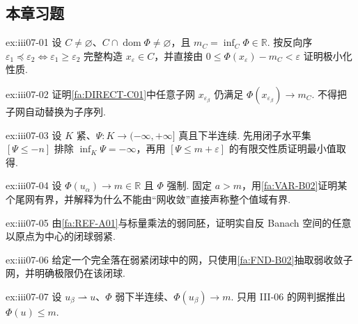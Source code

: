 \subsection*{本章习题}\label{sec:iii07-exercises}

\begin{FAExercise}[下确界与极小化网]{ex:iii07-01}
设 \(\displaystyle C\neq\varnothing\)、\(\displaystyle C\cap\operatorname{dom}\Phi\neq\varnothing\)，且 \(\displaystyle m_C=\inf_C\Phi\in\mathbb R\). 按反向序 \(\displaystyle\varepsilon_1\preceq\varepsilon_2\iff\varepsilon_1\geqslant\varepsilon_2\) 完整构造 \(\displaystyle x_\varepsilon\in C\)，并直接由 \(\displaystyle0\leqslant\Phi(x_\varepsilon)-m_C<\varepsilon\) 证明极小化性质.
\end{FAExercise}

\begin{FAExercise}[子网保持极小化性质]{ex:iii07-02}
证明\autoref{fa:DIRECT-C01}中任意子网 \(\displaystyle x_{\varepsilon_\beta}\) 仍满足 \(\displaystyle\Phi(x_{\varepsilon_\beta})\to m_C\). 不得把子网自动替换为子序列.
\end{FAExercise}

\begin{FAExercise}[紧空间下半连续最小值的有限交性质证明]{ex:iii07-03}
设 \(\displaystyle K\) 紧、\(\displaystyle\Psi:K\to(-\infty,+\infty]\) 真且下半连续. 先用闭子水平集 \(\displaystyle[\Psi\leqslant-n]\) 排除 \(\displaystyle\inf_K\Psi=-\infty\)，再用 \(\displaystyle[\Psi\leqslant m+\varepsilon]\) 的有限交性质证明最小值取得.
\end{FAExercise}

\begin{FAExercise}[强制有界尾网]{ex:iii07-04}
设 \(\displaystyle\Phi(u_\alpha)\to m\in\mathbb R\) 且 \(\displaystyle\Phi\) 强制. 固定 \(\displaystyle a>m\)，用\autoref{fa:VAR-B02}证明某个尾网有界，并解释为什么不能由“网收敛”直接声称整个值域有界.
\end{FAExercise}

\begin{FAExercise}[自反弱紧闭球]{ex:iii07-05}
由\autoref{fa:REF-A01}与标量乘法的弱同胚，证明实自反 Banach 空间的任意以原点为中心的闭球弱紧.
\end{FAExercise}

\begin{FAExercise}[紧性的子网抽取]{ex:iii07-06}
给定一个完全落在弱紧闭球中的网，只使用\autoref{fa:FND-B02}抽取弱收敛子网，并明确极限仍在该闭球.
\end{FAExercise}

\begin{FAExercise}[弱下半连续下极限传递]{ex:iii07-07}
设 \(\displaystyle u_\beta\rightharpoonup u\)、\(\displaystyle\Phi\) 弱下半连续、\(\displaystyle\Phi(u_\beta)\to m\). 只用 III-06 的网判据推出 \(\displaystyle\Phi(u)\leqslant m\).
\end{FAExercise}

